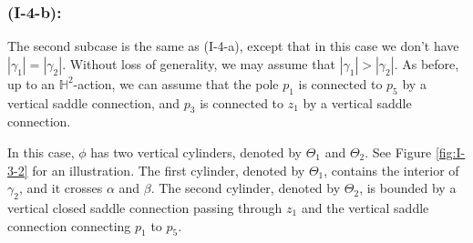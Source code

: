 \documentclass[11pt]{amsart}
\theoremstyle{plain}
\newcommand{\HP}{\mathbb{H}}
\begin{document}
\subsubsection*{\textbf{(I-4-b):}}
The second subcase is the same as (I-4-a), except that 
in this case we don't have $|\gamma_1| = |\gamma_2|$. 
Without loss of generality,
we may assume that 
$|\gamma_1|>|\gamma_2|$. As before, 
up to an $\HP^2$-action, we can assume that the pole $p_1$
is connected to  $p_5$ by a vertical saddle connection, and 
$p_3$
is connected to  $z_1$ by a vertical saddle connection.


In this case, $\phi$ has two vertical cylinders, denoted by $\Theta_1$ and $\Theta_2$. See Figure \ref{fig:I-3-2} for an illustration. The first cylinder, denoted by $\Theta_1$, contains 
the interior of $\gamma_2$, and it crosses $\alpha$ and $\beta$. The second cylinder, denoted by $\Theta_2$,
is bounded by a vertical closed saddle connection passing through $z_1$ and the vertical saddle connection connecting $p_1$ to $p_5$. 
\end{document}
